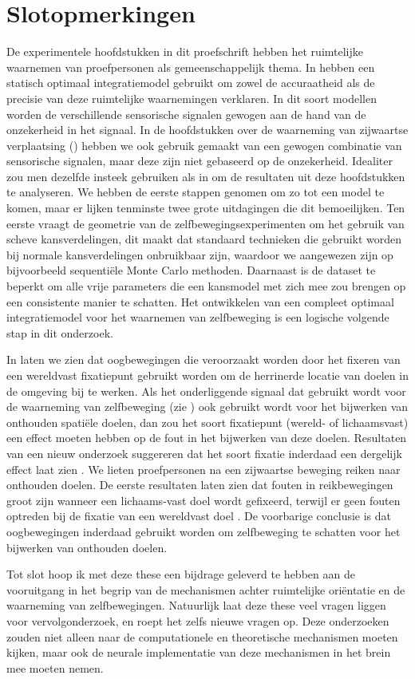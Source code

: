 \section{Slotopmerkingen}
De experimentele hoofdstukken in dit proefschrift hebben het ruimtelijke waarnemen van proefpersonen als gemeenschappelijk thema. In  hebben een statisch optimaal integratiemodel gebruikt om zowel de accuraatheid als de precisie van deze ruimtelijke waarnemingen verklaren. In dit soort modellen worden de verschillende sensorische signalen gewogen aan de hand van de onzekerheid in het signaal. In de hoofdstukken over de waarneming van zijwaartse verplaatsing () hebben we ook gebruik gemaakt van een gewogen combinatie van sensorische signalen, maar deze zijn niet gebaseerd op de onzekerheid. Idealiter zou men dezelfde insteek gebruiken als in  om de resultaten uit deze hoofdstukken te analyseren. We hebben de eerste stappen genomen om zo tot een model te komen, maar er lijken tenminste twee grote uitdagingen die dit bemoeilijken. Ten eerste vraagt de geometrie van de zelfbewegingsexperimenten om het gebruik van scheve kansverdelingen, dit maakt dat standaard technieken die gebruikt worden bij normale kansverdelingen onbruikbaar zijn, waardoor we aangewezen zijn op bijvoorbeeld sequenti\"ele Monte Carlo methoden. Daarnaast is de dataset te beperkt om alle vrije parameters die een kansmodel met zich mee zou brengen op een consistente manier te schatten. Het ontwikkelen van een compleet optimaal integratiemodel voor het waarnemen van zelfbeweging is een logische volgende stap in dit onderzoek.

In  laten we zien dat oogbewegingen die veroorzaakt worden door het fixeren van een wereldvast fixatiepunt gebruikt worden om de herrinerde locatie van doelen in de omgeving bij te werken. Als het onderliggende signaal dat gebruikt wordt voor de waarneming van zelfbeweging (zie ) ook gebruikt wordt voor het bijwerken van onthouden spati\"ele doelen, dan zou het soort fixatiepunt (wereld- of lichaamsvast) een effect moeten hebben op de fout in het bijwerken van deze doelen. Resultaten van een nieuw onderzoek suggereren dat het soort fixatie inderdaad een dergelijk effect laat zien \cite{clemens2010}. We lieten proefpersonen na een zijwaartse beweging reiken naar onthouden doelen. De eerste resultaten laten zien dat fouten in reikbewegingen groot zijn wanneer een lichaams-vast doel wordt gefixeerd, terwijl er geen fouten optreden bij de fixatie van een wereldvast doel \cite{clemens2010}. De voorbarige conclusie is dat oogbewegingen inderdaad gebruikt worden om zelfbeweging te schatten voor het bijwerken van onthouden doelen.

Tot slot hoop ik met deze these een bijdrage geleverd te hebben aan de vooruitgang in het begrip van de mechanismen achter ruimtelijke ori\"entatie en de waarneming van zelfbewegingen. Natuurlijk laat deze these veel vragen liggen voor vervolgonderzoek, en roept het zelfs nieuwe vragen op. Deze onderzoeken zouden niet alleen naar de computationele en theoretische mechanismen moeten kijken, maar ook de neurale implementatie van deze mechanismen in het brein mee moeten nemen.
